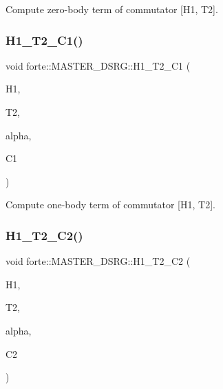 Compute zero-\/body term of commutator \mbox{[}H1, T2\mbox{]}. 

\mbox{\label{classforte_1_1_m_a_s_t_e_r___d_s_r_g_ac5b45c4abfa928d4d2b425f217e5e72e}} 
\subsubsection{\texorpdfstring{H1\+\_\+\+T2\+\_\+\+C1()}{H1\_T2\_C1()}}
{\footnotesize\ttfamily void forte\+::\+M\+A\+S\+T\+E\+R\+\_\+\+D\+S\+R\+G\+::\+H1\+\_\+\+T2\+\_\+\+C1 (\begin{DoxyParamCaption}\item[{Blocked\+Tensor \&}]{H1,  }\item[{Blocked\+Tensor \&}]{T2,  }\item[{const double \&}]{alpha,  }\item[{Blocked\+Tensor \&}]{C1 }\end{DoxyParamCaption})\hspace{0.3cm}{\ttfamily [protected]}}



Compute one-\/body term of commutator \mbox{[}H1, T2\mbox{]}. 

\mbox{\label{classforte_1_1_m_a_s_t_e_r___d_s_r_g_a7923e4cf5d48d8e877c17b8155a653e1}} 
\subsubsection{\texorpdfstring{H1\+\_\+\+T2\+\_\+\+C2()}{H1\_T2\_C2()}}
{\footnotesize\ttfamily void forte\+::\+M\+A\+S\+T\+E\+R\+\_\+\+D\+S\+R\+G\+::\+H1\+\_\+\+T2\+\_\+\+C2 (\begin{DoxyParamCaption}\item[{Blocked\+Tensor \&}]{H1,  }\item[{Blocked\+Tensor \&}]{T2,  }\item[{const double \&}]{alpha,  }\item[{Blocked\+Tensor \&}]{C2 }\end{DoxyParamCaption})\hspace{0.3cm}{\ttfamily [protected]}}



